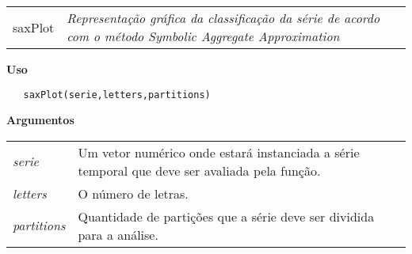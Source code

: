 
\hrulefill   

\begin{table}[!ht]
\begin{center}
\begin{tabularx}{\textwidth}{ X X}
\hspace{0.5cm} saxPlot & \textit{Representação gráfica da classificação da série de acordo com o método Symbolic Aggregate Approximation}\\
\end{tabularx}
\end{center}
\end{table} 

\vspace{-0.5cm}

\hrulefill  

\vspace{0.5cm}

\textbf{Uso}

\begin{lstlisting}
   saxPlot(serie,letters,partitions)
\end{lstlisting}

\vspace{1.5cm}

\textbf{Argumentos}

\begin{table}[!ht]
\begin{center}
\begin{tabularx}{\textwidth}{X X}
\hspace{0.5cm} \textit{serie} \vspace{0.5cm}& Um vetor numérico onde estará instanciada a série temporal que deve ser avaliada pela função.\vspace{0.5cm}\\
\hspace{0.5cm} \textit{letters} \vspace{0.5cm}&  O número de letras.\vspace{0.5cm}\\
\hspace{0.5cm} \textit{partitions} \vspace{0.5cm}& Quantidade de partições que a série deve ser dividida para a análise.\vspace{0.5cm}\\
\end{tabularx}
\end{center}
\end{table} 

